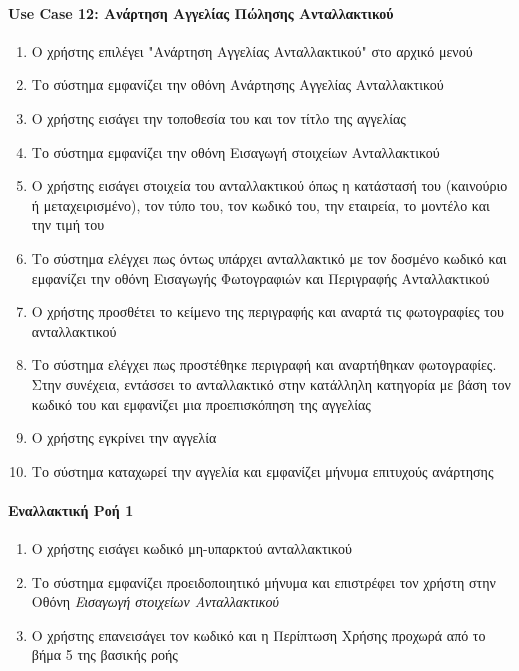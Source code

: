 \documentclass{../ol-softwaremanual}
\begin{document}
	\paragraph{\en Use Case 12: \gr Ανάρτηση Αγγελίας Πώλησης Ανταλλακτικού \gr}
	
	\begin{enumerate}
		\item Ο χρήστης επιλέγει \en"\gr Ανάρτηση Αγγελίας Ανταλλακτικού\en" \gr στο αρχικό μενού
		\item Το σύστημα εμφανίζει την οθόνη Ανάρτησης Αγγελίας Ανταλλακτικού
		\item Ο χρήστης εισάγει την τοποθεσία του και τον τίτλο της αγγελίας
		\item Το σύστημα εμφανίζει την οθόνη Εισαγωγή στοιχείων Ανταλλακτικού
		\item Ο χρήστης εισάγει στοιχεία του ανταλλακτικού όπως η κατάστασή του (καινούριο ή μεταχειρισμένο), τον τύπο του, τον κωδικό του, την εταιρεία, το μοντέλο και την τιμή του
		\item Το σύστημα ελέγχει πως όντως υπάρχει ανταλλακτικό με τον δοσμένο κωδικό και εμφανίζει την οθόνη Εισαγωγής Φωτογραφιών και Περιγραφής Ανταλλακτικού
		\item Ο χρήστης προσθέτει το κείμενο της περιγραφής και αναρτά τις φωτογραφίες του ανταλλακτικού
		\item Το σύστημα ελέγχει πως προστέθηκε περιγραφή και αναρτήθηκαν φωτογραφίες. Στην συνέχεια, εντάσσει το ανταλλακτικό στην κατάλληλη κατηγορία με βάση τον κωδικό του και εμφανίζει μια προεπισκόπηση της αγγελίας
		\item Ο χρήστης εγκρίνει την αγγελία
		\item Το σύστημα καταχωρεί την αγγελία και εμφανίζει μήνυμα επιτυχούς ανάρτησης
	\end{enumerate}


	\paragraph{Εναλλακτική Ροή 1}
	
	\begin{enumerate}
		\item Ο χρήστης εισάγει κωδικό μη-υπαρκτού ανταλλακτικού
		\item Το σύστημα εμφανίζει προειδοποιητικό μήνυμα και επιστρέφει τον χρήστη στην Οθόνη \textit{Εισαγωγή στοιχείων Ανταλλακτικού}
		\item Ο χρήστης επανεισάγει τον κωδικό και η Περίπτωση Χρήσης προχωρά από το βήμα 5 της βασικής ροής
	\end{enumerate}
\end{document}
